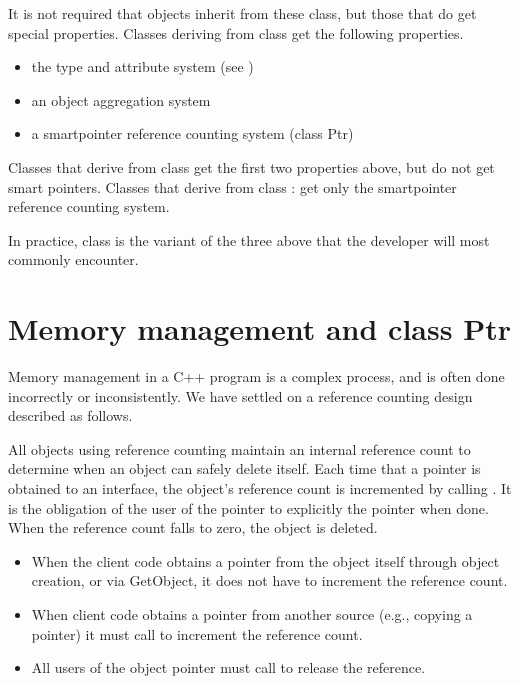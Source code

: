 \documentclass[letterpaper,10pt,english]{sphinxmanual}
\renewcommand{\sphinxcode}[1]{\texttt{\small{#1}}}
\begin{document}
It is not required that  objects inherit from these class, but
those that do get special properties. Classes deriving from
class \sphinxcode{} get the following properties.
\begin{itemize}
\item {} 
the  type and attribute system (see {\hyperref[\detokenize{attributes:attributes}]{}})

\item {} 
an object aggregation system

\item {} 
a smart\sphinxhyphen{}pointer reference counting system (class Ptr)

\end{itemize}

Classes that derive from class \sphinxcode{} get the first two
properties above, but do not get smart pointers. Classes that derive from class
\sphinxcode{}: get only the smart\sphinxhyphen{}pointer reference counting
system.

In practice, class \sphinxcode{} is the variant of the three above that
the  developer will most commonly encounter.


\section{Memory management and class Ptr}
\label{\detokenize{object-model:memory-management-and-class-ptr}}\label{\detokenize{object-model:id2}}
Memory management in a C++ program is a complex process, and is often done
incorrectly or inconsistently. We have settled on a reference counting design
described as follows.

All objects using reference counting maintain an internal reference count to
determine when an object can safely delete itself. Each time that a pointer is
obtained to an interface, the object’s reference count is incremented by calling
\sphinxcode{}. It is the obligation of the user of the pointer to explicitly
\sphinxcode{} the pointer when done. When the reference count falls to zero, the
object is deleted.
\begin{itemize}
\item {} 
When the client code obtains a pointer from the object itself through object
creation, or via GetObject, it does not have to increment the reference count.

\item {} 
When client code obtains a pointer from another source (e.g., copying a
pointer) it must call \sphinxcode{} to increment the reference count.

\item {} 
All users of the object pointer must call \sphinxcode{} to release the
reference.

\end{itemize}
\end{document}
